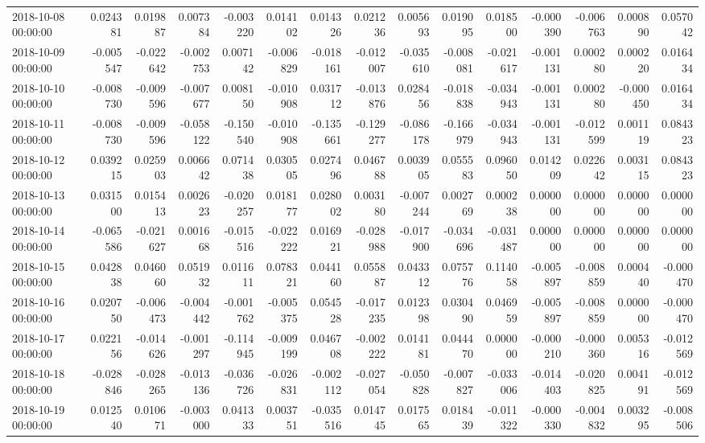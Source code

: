 \begin{tabular}{lrrrrrrrrrrrrrr}
2018-10-08 00:00:00 & 0.024381 & 0.019887 & 0.007384 & -0.003220 & 0.014102 & 0.014326 & 0.021236 & 0.005693 & 0.019095 & 0.018500 & -0.000390 & -0.006763 & 0.000890 & 0.057042 \\
2018-10-09 00:00:00 & -0.005547 & -0.022642 & -0.002753 & 0.007142 & -0.006829 & -0.018161 & -0.012007 & -0.035610 & -0.008081 & -0.021617 & -0.001131 & 0.000280 & 0.000220 & 0.016434 \\
2018-10-10 00:00:00 & -0.008730 & -0.009596 & -0.007677 & 0.008150 & -0.010908 & 0.031712 & -0.013876 & 0.028456 & -0.018838 & -0.034943 & -0.001131 & 0.000280 & -0.000450 & 0.016434 \\
2018-10-11 00:00:00 & -0.008730 & -0.009596 & -0.058122 & -0.150540 & -0.010908 & -0.135661 & -0.129277 & -0.086178 & -0.166979 & -0.034943 & -0.001131 & -0.012599 & 0.001119 & 0.084323 \\
2018-10-12 00:00:00 & 0.039215 & 0.025903 & 0.006642 & 0.071438 & 0.030505 & 0.027496 & 0.046788 & 0.003905 & 0.055583 & 0.096050 & 0.014209 & 0.022642 & 0.003115 & 0.084323 \\
2018-10-13 00:00:00 & 0.031500 & 0.015413 & 0.002623 & -0.020257 & 0.018177 & 0.028002 & 0.003180 & -0.007244 & 0.002769 & 0.000238 & 0.000000 & 0.000000 & 0.000000 & 0.000000 \\
2018-10-14 00:00:00 & -0.065586 & -0.021627 & 0.001668 & -0.015516 & -0.022222 & 0.016921 & -0.028988 & -0.017900 & -0.034696 & -0.031487 & 0.000000 & 0.000000 & 0.000000 & 0.000000 \\
2018-10-15 00:00:00 & 0.042838 & 0.046060 & 0.051932 & 0.011611 & 0.078321 & 0.044160 & 0.055887 & 0.043312 & 0.075776 & 0.114058 & -0.005897 & -0.008859 & 0.000440 & -0.000470 \\
2018-10-16 00:00:00 & 0.020750 & -0.006473 & -0.004442 & -0.001762 & -0.005375 & 0.054528 & -0.017235 & 0.012398 & 0.030490 & 0.046959 & -0.005897 & -0.008859 & 0.000000 & -0.000470 \\
2018-10-17 00:00:00 & 0.022156 & -0.014626 & -0.001297 & -0.114945 & -0.009199 & 0.046708 & -0.002222 & 0.014181 & 0.044470 & 0.000000 & -0.000210 & -0.000360 & 0.005316 & -0.012569 \\
2018-10-18 00:00:00 & -0.028846 & -0.028265 & -0.013136 & -0.036726 & -0.026831 & -0.002112 & -0.027054 & -0.050828 & -0.007827 & -0.033006 & -0.014403 & -0.020825 & 0.004191 & -0.012569 \\
2018-10-19 00:00:00 & 0.012540 & 0.010671 & -0.003000 & 0.041333 & 0.003751 & -0.035516 & 0.014745 & 0.017565 & 0.018439 & -0.011322 & -0.000330 & -0.004832 & 0.003295 & -0.008506 \\

\end{tabular}
